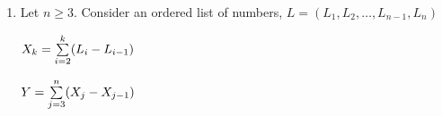 \documentclass[12pt]{article}
\begin{document}
\begin{enumerate}
{\color{blue}
{\bf Answer:} \\\\
$f(n) = \sum^n_{y{=}1} (n^2 \cdot y^{13})$ \\\\
$\sum^n_{y{=}1} (n^2 \cdot y^{13}) \leq \sum^n_{y{=}1} (n^2 \cdot n^{13})$ \\\\
$\sum^n_{y{=}1} (n^2 \cdot n^{13}) = n^2 \cdot n^{14} = n^{16}$ \\\\
$g(n) = n^{16}$ \\\\
$f(n) = O(n^{16})$ \\\\
\\\\\\
$\sum^n_{y{=}1} (n^2 \cdot y^{13}) \geq \sum^n_{y{=}\frac{n}{2}} (n^2 \cdot n^{13}) \geq \sum^n_{y{=}\frac{n}{2}} (n^2 \cdot {\frac{n}{2}}^{13})$ \\\\
$\sum^n_{y{=}\frac{n}{2}} (n^2 \cdot n^{13}) \geq $ \\\\
$\sum^n_{y=\frac{n}{2}} \left(n^2 \cdot \left(\frac{n}{2}\right)^{13}\right) = \frac{n}{2} \cdot n^2 \cdot \frac{n^{13}}{2^{13}}$ \\\\
$\frac{n}{2} \cdot n^2 \cdot \frac{n^{13}}{2^{13}} = \frac{1}{2^{14}} \cdot n^{16}$ \\\\$f(n) \geq n^{16}$ \\\\
$f(n) = \Omega(n^{16})$\\\\
\\\\
$f(n) = \theta(n^{16})$$\blacksquare$\\\\
}






\newpage

\item
Let $n\geqslant 3$.
Consider an ordered list of numbers, $L = (L_1,L_2,\ldots,L_{n-1},L_n)$

$\Large X_k = \sum\limits_{i=2}^k (L_i - L_{i-1}) $ 

$\Large Y = \sum\limits_{j=3}^n (X_j - X_{j-1}) $ 


\end{enumerate}
\end{document}
